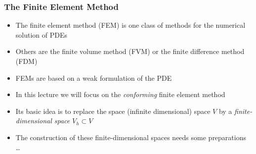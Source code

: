 \documentclass[aspectratio=169,11pt]{beamer}
\theoremstyle{definition}
\begin{document}
\begin{frame}
\frametitle{The Finite Element Method}
\begin{itemize}
\item The finite element method (FEM) is one class of methods for the numerical solution of PDEs
\item Others are the finite volume method (FVM) or the finite difference method (FDM)
\item FEMs are based on a weak formulation of the PDE
\item In this lecture we will focus on the \textit{conforming} finite element method
\item Its basic idea is to replace the space (infinite dimensional) space $V$ by a {\em finite-dimensional space} $V_h\subset V$
\item The construction of these finite-dimensional spaces needs some preparations \ldots
\end{itemize}
\end{frame}
\end{document}
